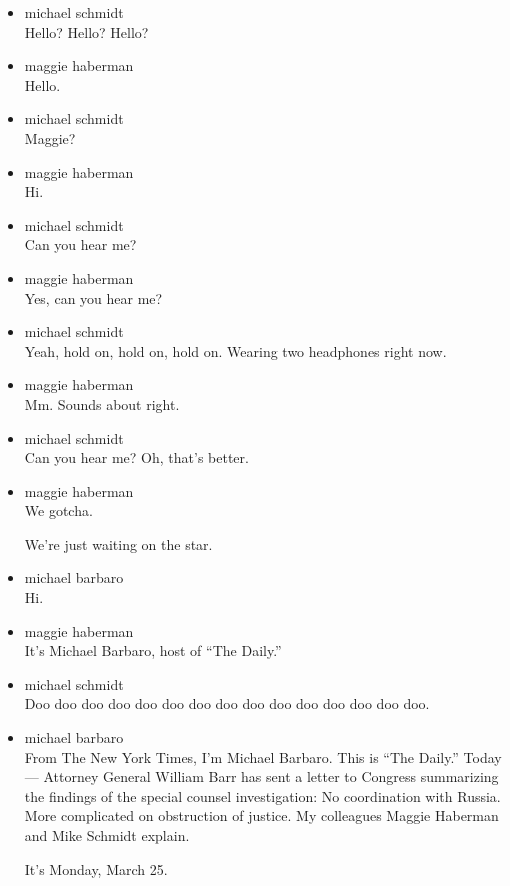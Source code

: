 \begin{itemize}
\item
  michael schmidt\\
  Hello? Hello? Hello?
\item
  maggie haberman\\
  Hello.
\item
  michael schmidt\\
  Maggie?
\item
  maggie haberman\\
  Hi.
\item
  michael schmidt\\
  Can you hear me?
\item
  maggie haberman\\
  Yes, can you hear me?
\item
  michael schmidt\\
  Yeah, hold on, hold on, hold on. Wearing two headphones right now.
\item
  maggie haberman\\
  Mm. Sounds about right.
\item
  michael schmidt\\
  Can you hear me? Oh, that's better.
\item
  maggie haberman\\
  We gotcha.

  We're just waiting on the star.
\item
  michael barbaro\\
  Hi.
\item
  maggie haberman\\
  It's Michael Barbaro, host of ``The Daily.''
\item
  michael schmidt\\
  Doo doo doo doo doo doo doo doo doo doo doo doo doo doo doo.
\item
  michael barbaro\\
  From The New York Times, I'm Michael Barbaro. This is ``The Daily.''
  Today --- Attorney General William Barr has sent a letter to Congress
  summarizing the findings of the special counsel investigation: No
  coordination with Russia. More complicated on obstruction of justice.
  My colleagues Maggie Haberman and Mike Schmidt explain.

  It's Monday, March 25.


\end{itemize}
